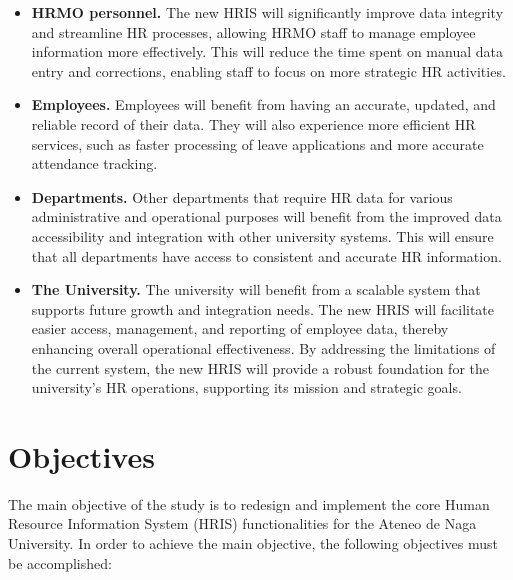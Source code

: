     \begin{itemize}
        \item[] \textbf{HRMO personnel.} The new HRIS will significantly improve data integrity and streamline HR processes, allowing HRMO staff to manage employee information more effectively. This will reduce the time spent on manual data entry and corrections, enabling staff to focus on more strategic HR activities.

        \item[] \textbf{Employees.} Employees will benefit from having an accurate, updated, and reliable record of their data. They will also experience more efficient HR services, such as faster processing of leave applications and more accurate attendance tracking. 

        \item[] \textbf{Departments.} Other departments that require HR data for various administrative and operational purposes will benefit from the improved data accessibility and integration with other university systems. This will ensure that all departments have access to consistent and accurate HR information.

        \item[] \textbf{The University.} The university will benefit from a scalable system that supports future growth and integration needs. The new HRIS will facilitate easier access, management, and reporting of employee data, thereby enhancing overall operational effectiveness. By addressing the limitations of the current system, the new HRIS will provide a robust foundation for the university's HR operations, supporting its mission and strategic goals.
    \end{itemize}
    
\section{Objectives}

    The main objective of the study is to redesign and implement the core Human Resource Information System (HRIS) functionalities for the Ateneo de Naga University. In order to achieve the main objective, the following objectives must be accomplished:

